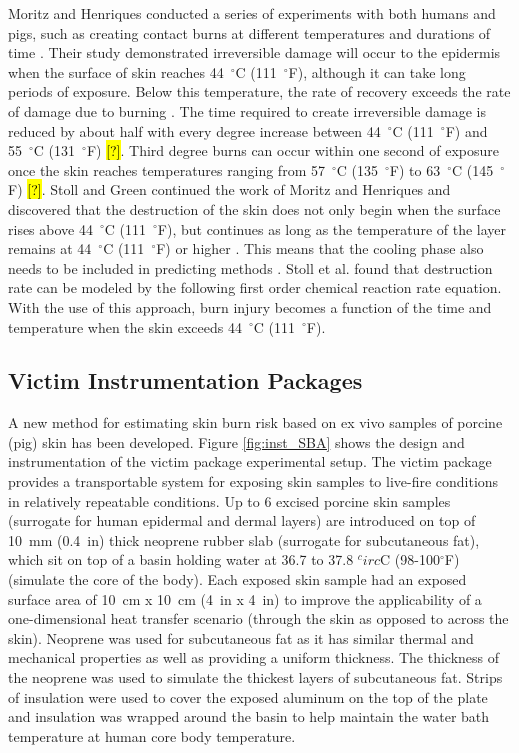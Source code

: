 \documentclass[12pt,oneside]{book}
\begin{document}
Moritz and Henriques conducted a series of experiments with both humans and pigs, such as creating contact burns at different temperatures and durations of time \cite{Time_Temperature_Cutaneous_Burns}. Their study demonstrated irreversible damage will occur to the epidermis when the surface of skin reaches 44~$^\circ$C (111~$^\circ$F), although it can take long periods of exposure. Below this temperature, the rate of recovery exceeds the rate of damage due to burning \cite{Thermal_Electronic}. The time required to create irreversible damage is reduced by about half with every degree increase between 44~$^\circ$C (111~$^\circ$F) and 55~$^\circ$C (131~$^\circ$F) \cite{Thermal_Electronic}\hl{[?]}. Third degree burns can occur within one second of exposure once the skin reaches temperatures ranging from 57~$^\circ$C (135~$^\circ$F) to 63~$^\circ$C (145~$^\circ$F) \cite{Thermal_Electronic}\hl{[?]}. Stoll and Green continued the work of Moritz and Henriques and discovered that the destruction of the skin does not only begin when the surface rises above 44~$^\circ$C (111~$^\circ$F), but continues as long as the temperature of the layer remains at 44~$^\circ$C (111~$^\circ$F) or higher \cite{Pain_Thermal_Radiation}. This means that the cooling phase also needs to be included in pred{}i{}cting methods \cite{Standard_Manikin}. Stoll et al. found that destruction rate can be modeled by the following first order chemical reaction rate equation.  With the use of this approach, burn injury becomes a function of the time and temperature when the skin exceeds 44~$^\circ$C (111~$^\circ$F). 

\subsection{Victim Instrumentation Packages}
A new method for estimating skin burn risk based on ex vivo samples of porcine (pig) skin has been developed. Figure \ref{fig:inst_SBA} shows the design and instrumentation of the victim package experimental setup. The victim package provides a transportable system for exposing skin samples to live-fire conditions in relatively repeatable conditions.  Up to 6 excised porcine skin samples (surrogate for human epidermal and dermal layers) are introduced on top of 10~mm (0.4~in) thick neoprene rubber slab (surrogate for subcutaneous fat), which sit on top of a basin holding water at 36.7 to 37.8 $^circ$C (98-100$^\circ$F) (simulate the core of the body).  Each exposed skin sample had an exposed surface area of 10~cm x 10~cm (4~in x 4~in) to improve the applicability of a one-dimensional heat transfer scenario (through the skin as opposed to across the skin).  Neoprene was used for subcutaneous fat as it has similar thermal and mechanical properties as well as providing a uniform thickness. The thickness of the neoprene was used to simulate the thickest layers of subcutaneous fat. Strips of insulation were used to cover the exposed aluminum on the top of the plate and insulation was wrapped around the basin to help maintain the water bath temperature at human core body temperature. 
\end{document}
